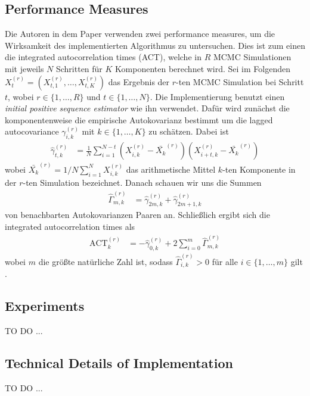 \documentclass{scrartcl}
\begin{document}
    \subsection{Performance Measures}
    Die Autoren in dem Paper \cite{lau2019} verwenden zwei performance measures, um die Wirksamkeit des implementierten
    Algorithmus zu untersuchen. Dies ist zum einen die integrated autocorrelation times (ACT), welche in $R$ MCMC
    Simulationen mit jeweils $N$ Schritten für $K$ Komponenten berechnet wird. Sei im Folgenden
    $X_t^{(r)}=(X_{t,1}^{(r)},\dots,X_{t,K}^{(r)})$ das Ergebnis der $r$-ten MCMC Simulation bei Schritt $t$, wobei
    $r\in\{1,\dots,R\}$ und $t\in\{1,\dots,N\}$. Die Implementierung benutzt einen \textit{initial positive sequence estimator}
    wie ihn \cite{geyer1992} verwendet. Dafür wird zunächst die komponentenweise die empirische Autokovarianz bestimmt um
    die lagged autocovariance $\gamma_{i,k}^{(r)}$ mit $k\in\{1,\dots,K\}$ zu schätzen. Dabei ist
    \begin{align*}
        \hat{\gamma}_{t,k}^{(r)}&=\frac{1}{N}\sum\limits_{i=1}^{N-t}(X_{i,k}^{(r)}-\bar{X_k}^{(r)})(X_{i+t,k}^{(r)}-\bar{X_k}^{(r)})
    \end{align*}
    wobei $\bar{X_k}^{(r)}=1/N\sum\nolimits_{i=1}^NX_{i,k}^{(r)}$ das arithmetische Mittel $k$-ten Komponente in der $r$-ten
    Simulation bezeichnet. Danach schauen wir uns die Summen
    \begin{align*}
        \hat{\Gamma}_{m,k}^{(r)} &= \hat{\gamma}_{2m,k}^{(r)} + \hat{\gamma}_{2m+1,k}^{(r)}
    \end{align*}
    von benachbarten Autokovarianzen Paaren an. Schließlich ergibt sich die integrated autocorrelation times als
    \begin{align*}
        \text{ACT}_k^{(r)}&=-\hat{\gamma}_{0,k}^{(r)}+2\sum\limits_{i=0}^{m}\hat{\Gamma}_{m,k}^{(r)}
    \end{align*}
    wobei $m$ die größte natürliche Zahl ist, sodass $\hat{\Gamma}_{i,k}^{(r)} > 0$ für alle $i\in\{1,\dots,m\}$ gilt
    \cite{geyer1992}.

    \subsection{Experiments}
    TO DO ...

    \subsection{Technical Details of Implementation}
    TO DO ...
\end{document}

